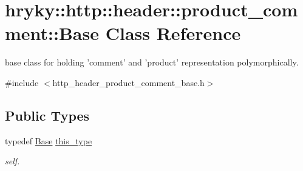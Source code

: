 \hypertarget{classhryky_1_1http_1_1header_1_1product__comment_1_1_base}{\section{hryky\-:\-:http\-:\-:header\-:\-:product\-\_\-comment\-:\-:Base Class Reference}
\label{classhryky_1_1http_1_1header_1_1product__comment_1_1_base}
}


base class for holding 'comment' and 'product' representation polymorphically.  




{\ttfamily \#include $<$http\-\_\-header\-\_\-product\-\_\-comment\-\_\-base.\-h$>$}

\subsection*{Public Types}
\begin{DoxyCompactItemize}
\item 
\hypertarget{classhryky_1_1http_1_1header_1_1product__comment_1_1_base_a2b2b9c50e25b1bbd7c1a77a69477409a}{typedef \hyperlink{classhryky_1_1http_1_1header_1_1product__comment_1_1_base}{Base} \hyperlink{classhryky_1_1http_1_1header_1_1product__comment_1_1_base_a2b2b9c50e25b1bbd7c1a77a69477409a}{this\-\_\-type}}\label{classhryky_1_1http_1_1header_1_1product__comment_1_1_base_a2b2b9c50e25b1bbd7c1a77a69477409a}

\begin{DoxyCompactList}\small\item\em self. \end{DoxyCompactList}\end{DoxyCompactItemize}

